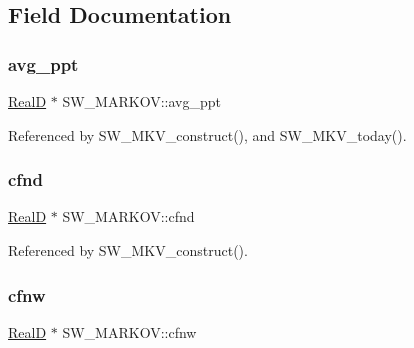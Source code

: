\subsection{Field Documentation}
\mbox{\label{struct_s_w___m_a_r_k_o_v_afe0733ac0a0dd4349cdb576c143fc6ce}} 
\subsubsection{\texorpdfstring{avg\+\_\+ppt}{avg\_ppt}}
{\footnotesize\ttfamily \hyperlink{generic_8h_af1c105fd5732f70b91ddaeda0cc340e3}{RealD} $\ast$ S\+W\+\_\+\+M\+A\+R\+K\+O\+V\+::avg\+\_\+ppt}



Referenced by S\+W\+\_\+\+M\+K\+V\+\_\+construct(), and S\+W\+\_\+\+M\+K\+V\+\_\+today().

\mbox{\label{struct_s_w___m_a_r_k_o_v_a7d55c486248a4f5546971939dc655d93}} 
\subsubsection{\texorpdfstring{cfnd}{cfnd}}
{\footnotesize\ttfamily \hyperlink{generic_8h_af1c105fd5732f70b91ddaeda0cc340e3}{RealD} $\ast$ S\+W\+\_\+\+M\+A\+R\+K\+O\+V\+::cfnd}



Referenced by S\+W\+\_\+\+M\+K\+V\+\_\+construct().

\mbox{\label{struct_s_w___m_a_r_k_o_v_a8362112fd3d01a56ef16fb02b6922577}} 
\subsubsection{\texorpdfstring{cfnw}{cfnw}}
{\footnotesize\ttfamily \hyperlink{generic_8h_af1c105fd5732f70b91ddaeda0cc340e3}{RealD} $\ast$ S\+W\+\_\+\+M\+A\+R\+K\+O\+V\+::cfnw}



